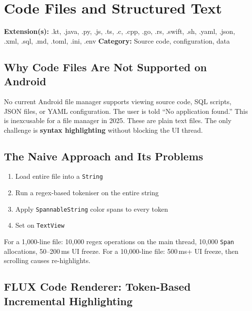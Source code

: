 \documentclass[11pt, a4paper, openright]{report}
\newcommand{\filesection}[3]{%
  \begin{insightbox}[title={File Type Overview: #1}]
  \textbf{Extension(s):} #2 \quad \textbf{Category:} #3
  \end{insightbox}
}
\begin{document}
\chapter{Code Files and Structured Text}

\filesection{Code}{.kt, .java, .py, .js, .ts, .c, .cpp, .go, .rs, .swift, .sh, .yaml, .json, .xml, .sql, .md, .toml, .ini, .env}{Source code, configuration, data}

\section{Why Code Files Are Not Supported on Android}

No current Android file manager supports viewing source code, SQL scripts, JSON files, or YAML configuration. The user is told ``No application found.'' This is inexcusable for a file manager in 2025. These are plain text files. The only challenge is \textbf{syntax highlighting} without blocking the UI thread.

\section{The Naive Approach and Its Problems}

\begin{enumerate}
  \item Load entire file into a \texttt{String}
  \item Run a regex-based tokeniser on the entire string
  \item Apply \texttt{SpannableString} color spans to every token
  \item Set on \texttt{TextView}
\end{enumerate}

For a 1,000-line file: 10,000 regex operations on the main thread, 10,000 \texttt{Span} allocations, 50--200\,ms UI freeze. For a 10,000-line file: 500\,ms+ UI freeze, then scrolling causes re-highlights.

\section{FLUX Code Renderer: Token-Based Incremental Highlighting}
\end{document}
